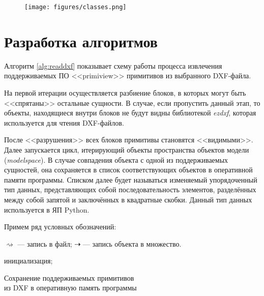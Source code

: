 \begin{figure}[H]
	\centering
	\texttt{[image: figures/classes.png]}
	\label{fig:classes}
\end{figure}


\section{Разработка алгоритмов} \label{sec:algs}
Алгоритм \ref{alg:readdxf} показывает схему работы процесса извлечения поддерживаемых ПО <<primiview>> примитивов из выбранного DXF-файла.

На первой итерации осуществляется разбиение блоков, в которых могут быть <<спрятаны>> остальные сущности. В случае, если пропустить данный этап, то объекты, находящиеся внутри блоков не будут видны библиотекой \textit{ezdxf}, которая используется для чтения DXF-файлов.

После <<разрушения>> всех блоков примитивы становятся <<видимыми>>. Далее запускается цикл, итерирующий объекты пространства объектов модели (\textit{modelspace}). В случае совпадения объекта с одной из поддерживаемых сущностей, она сохраняется в список соответствующих объектов в оперативной памяти программы. Списком далее будет называться изменяемый упорядоченный тип данных, представляющих собой последовательность элементов, разделённых между собой запятой и заключённых в квадратные скобки. Данный тип данных используется в ЯП Python.

Примем ряд условных обозначений:

$\rightsquigarrow$ --- запись в файл;
$\dashrightarrow$ --- запись объекта в множество.


\begin{algorithm}[H]
	\SetAlgoLined
	инициализация;
	
	
	
	\caption[Сохранение поддерживаемых примитивов; из DXF в оперативную память программы]
	{Сохранение поддерживаемых примитивов \\ из DXF в оперативную память программы\endtabular}
	\label{alg:readdxf}
\end{algorithm}

